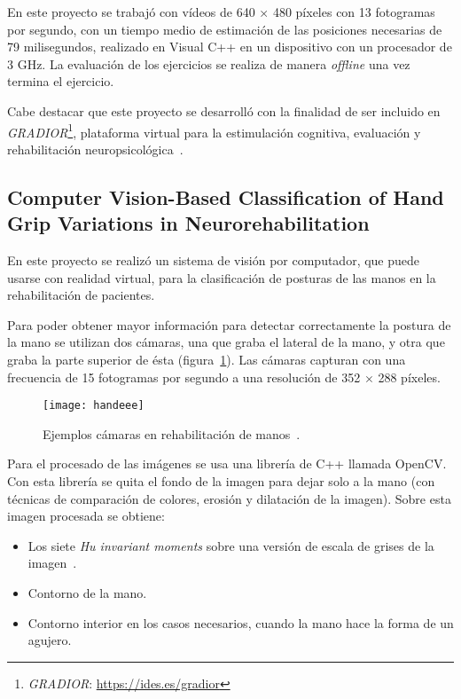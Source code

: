 En este proyecto se trabajó con vídeos de 640 × 480 píxeles con 13 fotogramas por segundo, con un tiempo medio de estimación de las posiciones necesarias de 79 milisegundos, realizado en Visual C++ en un dispositivo con un procesador de 3 GHz. La evaluación de los ejercicios se realiza de manera \textit{offline} una vez termina el ejercicio. 

Cabe destacar que este proyecto se desarrolló con la finalidad de ser incluido en \textit{GRADIOR}\footnote{\textit{GRADIOR}: \url{https://ides.es/gradior}}, plataforma virtual para la estimulación cognitiva, evaluación y rehabilitación neuropsicológica~\cite{gradior}.

\subsection{Computer Vision-Based Classification of Hand Grip Variations in Neurorehabilitation~\cite{hand}}
En este proyecto se realizó un sistema de visión por computador, que puede usarse con realidad virtual, para la clasificación de posturas de las manos en la rehabilitación de pacientes.

Para poder obtener mayor información para detectar correctamente la postura de la mano se utilizan dos cámaras, una que graba el lateral de la mano, y otra que graba la parte superior de ésta (figura~\ref{fig:hand}). Las cámaras capturan con una frecuencia de 15 fotogramas por segundo a una resolución de 352 $\times$ 288 píxeles.

\begin{figure}[ht]
	\centering
	\texttt{[image: handeee]}
	\caption[Ejemplos cámaras en rehabilitación de manos.]{Ejemplos cámaras en rehabilitación de manos~\cite{hand}.}
	\label{fig:hand}
\end{figure}

Para el procesado de las imágenes se usa una librería de C++ llamada OpenCV. Con esta librería se quita el fondo de la imagen para dejar solo a la mano (con técnicas de comparación de colores, erosión y dilatación de la imagen). Sobre esta imagen procesada se obtiene:
\begin{itemize}
	\item Los siete \textit{Hu invariant moments} sobre una versión de escala de grises de la imagen~\cite{humingkuei2011}.
	\item Contorno de la mano.
	\item Contorno interior en los casos necesarios, cuando la mano hace la forma de un agujero.
\end{itemize}

